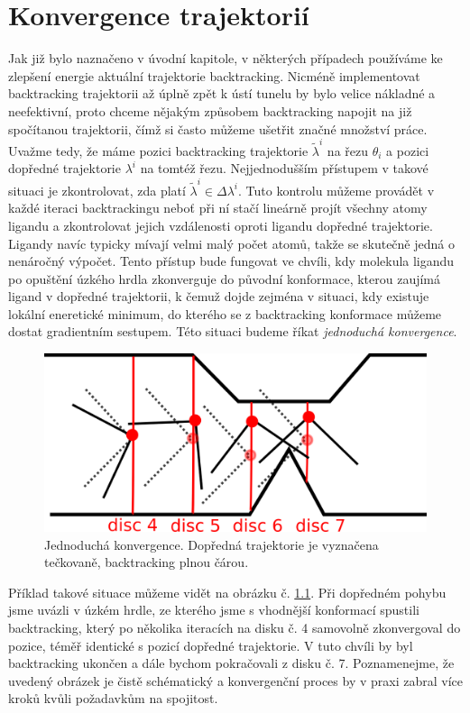 \chapter{Konvergence trajektorií}
Jak již bylo naznačeno v úvodní kapitole, v některých případech používáme ke
zlepšení energie aktuální trajektorie backtracking. Nicméně implementovat
backtracking trajektorii až úplně zpět k ústí tunelu by bylo velice nákladné
a neefektivní, proto chceme nějakým způsobem backtracking napojit na již
spočítanou trajektorii, čímž si často můžeme ušetřit značné množství práce.
Uvažme tedy, že máme pozici backtracking trajektorie $ \tilde{\lambda}^i $
na řezu $ \theta_i $ a pozici dopředné trajektorie $ \lambda^i $ na tomtéž řezu.
Nejjednodušším přístupem v takové situaci je zkontrolovat, zda platí
$ \tilde{\lambda}^i \in \Delta \lambda^i $. Tuto kontrolu můžeme provádět v každé
iteraci backtrackingu neboť při ní stačí lineárně projít všechny atomy ligandu
a zkontrolovat jejich vzdálenosti oproti ligandu dopředné trajektorie. Ligandy
navíc typicky mívají velmi malý počet atomů, takže se skutečně jedná o nenáročný
výpočet. Tento přístup bude fungovat ve chvíli, kdy molekula ligandu po opuštění
úzkého hrdla zkonverguje do původní konformace, kterou zaujímá ligand v dopředné
trajektorii, k čemuž dojde zejména v situaci, kdy existuje lokální eneretické
minimum, do kterého se z backtracking konformace můžeme dostat gradientním sestupem.
Této situaci budeme říkat \textit{jednoduchá konvergence}.

\begin{figure}[ht]
\centering
\includegraphics[width=.5\hsize]{img/backtracking_simple.png}
\caption{Jednoduchá konvergence. Dopředná trajektorie je vyznačena tečkovaně,
backtracking plnou čárou.
}
\label{fig:simple_convergence}
\end{figure}


Příklad takové situace můžeme vidět na obrázku č. \ref{fig:simple_convergence}.
Při dopředném pohybu jsme uvázli v úzkém hrdle, ze kterého jsme s vhodnější
konformací spustili backtracking, který po několika iteracích na disku č. 4
samovolně zkonvergoval do pozice, téměř identické s pozicí dopředné trajektorie.
V tuto chvíli by byl backtracking ukončen a dále bychom pokračovali z disku č. 7.
Poznamenejme, že uvedený obrázek je čistě schématický a konvergenční proces
by v praxi zabral více kroků kvůli požadavkům na spojitost.

